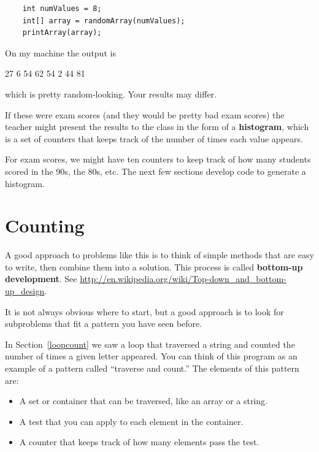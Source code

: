 \documentclass[12pt]{book}
\theoremstyle{exercise}
\begin{document}
\begin{lstlisting}
    int numValues = 8;
    int[] array = randomArray(numValues);
    printArray(array);
\end{lstlisting}
%
On my machine the output is

\begin{verbatimtab}
27
6
54
62
54
2
44
81
\end{verbatimtab}
%
which is pretty random-looking.  Your results may differ.

If these were exam scores (and they would be pretty bad exam
scores) the teacher might present the results to the class
in the form of a {\bf histogram}, which is a set of counters
that keeps track of the number of times each value appears.


For exam scores, we might have ten counters to keep track of
how many students scored in the 90s, the 80s, etc.  The next
few sections develop code to generate a histogram.


\section{Counting}

A good approach to problems like this is to think of simple methods
that are easy to write, then combine them into a solution.
This process is called {\bf bottom-up development}.
See \url{http://en.wikipedia.org/wiki/Top-down_and_bottom-up_design}.

It is not always obvious where to start,
but a good approach is to look for subproblems that fit a pattern you
have seen before.

In Section~\ref{loopcount} we saw a loop that traversed a
string and counted the number of times a given letter appeared.  You
can think of this program as an example of a pattern called ``traverse
and count.''  The elements of this pattern are:

\begin{itemize}

\item A set or container that can be traversed, like an array
or a string.

\item A test that you can apply to each element in the container.

\item A counter that keeps track of how many elements pass
the test.

\end{itemize}
\end{document}
